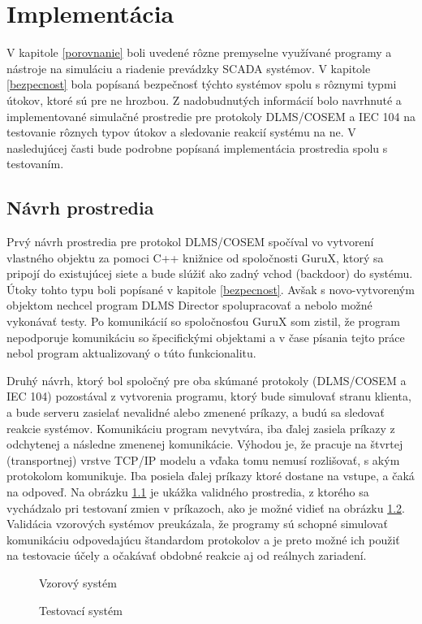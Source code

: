 \chapter{Implementácia}
\label{implementacia}
\tab V kapitole \ref{porovnanie} boli uvedené rôzne premyselne využívané programy a nástroje na simuláciu a riadenie prevádzky SCADA systémov. V kapitole \ref{bezpecnost} bola popísaná bezpečnosť týchto systémov spolu s rôznymi typmi útokov, ktoré sú pre ne hrozbou. Z nadobudnutých informácií bolo navrhnuté a implementované simulačné prostredie pre protokoly DLMS/COSEM a IEC 104 na testovanie rôznych typov útokov a sledovanie reakcií systému na ne. V nasledujúcej časti bude podrobne popísaná implementácia prostredia spolu s testovaním. \par
\section{Návrh prostredia}
\tab Prvý návrh prostredia pre protokol DLMS/COSEM spočíval vo vytvorení vlastného objektu za pomoci C++ knižnice od spoločnosti GuruX, ktorý sa pripojí do existujúcej siete a bude slúžiť ako zadný vchod (backdoor) do systému. Útoky tohto typu boli popísané v kapitole \ref{bezpecnost}. Avšak s novo-vytvoreným objektom nechcel program DLMS Director spolupracovať a nebolo možné vykonávať testy. Po komunikácií so spoločnosťou GuruX som zistil, že program nepodporuje komunikáciu so špecifickými objektami a v čase písania tejto práce nebol program aktualizovaný o túto funkcionalitu. \par
Druhý návrh, ktorý bol spoločný pre oba skúmané protokoly (DLMS/COSEM a IEC 104) pozostával z vytvorenia programu, ktorý bude simulovať stranu klienta, a bude serveru zasielať nevalidné alebo zmenené príkazy, a budú sa sledovať reakcie systémov. Komunikáciu program nevytvára, iba ďalej zasiela príkazy z odchytenej a následne zmenenej komunikácie. Výhodou je, že pracuje na štvrtej (transportnej) vrstve TCP/IP modelu a vďaka tomu nemusí rozlišovať, s akým protokolom komunikuje. Iba posiela ďalej príkazy ktoré dostane na vstupe, a čaká na odpoveď. Na obrázku \ref{orig} je ukážka validného prostredia, z ktorého sa vychádzalo pri testovaní zmien v príkazoch, ako je možné vidieť na obrázku \ref{test}. Validácia vzorových systémov preukázala, že programy sú schopné simulovať komunikáciu odpovedajúcu štandardom protokolov a je preto možné ich použiť na testovacie účely a očakávať obdobné reakcie aj od reálnych zariadení.
\begin{figure}[h]
    \centering
    \caption{Vzorový systém}
\label{orig}
\end{figure}
\begin{figure}[h]
    \centering
    \caption{Testovací systém}
\label{test}
\end{figure}
